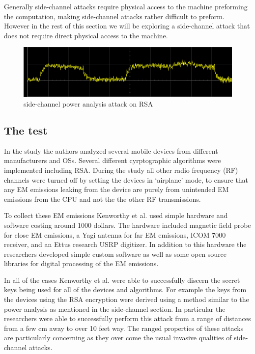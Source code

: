 \documentclass{sig-alternate}
\begin{document}
Generally side-channel attacks require physical access to the machine preforming the computation, making side-channel attacks rather difficult to preform. However in the rest of this section we will be exploring a side-channel attack that does not require direct physical access to the machine.    
 \begin{figure}
		\centering
		\includegraphics[scale=.5]{Power_attack.png}
		\caption{side-channel power analysis attack on RSA \cite{wiki:side-channel}}
		\label{Power}
		\end{figure}
\subsection{The test}
In the study the authors analyzed several mobile devices from different manufacturers and OSs. Several different cyrptographic algorithms were implemented including RSA. During the study all other radio frequency (RF) channels were turned off by setting the devices in `airplane' mode, to ensure that any EM emissions leaking from the device are purely from unintended EM emissions from the CPU and not the the other RF transmissions.

To collect these EM emissions Kenworthy et al. used simple hardware and software costing around 1000 dollars. The hardware included magnetic field probe for close EM emissions, a Yagi antenna for far EM emissions, ICOM 7000 receiver, and an Ettus research USRP digitizer. In addition to this hardware the researchers developed simple custom software as well as some open source libraries for digital processing of the EM emissions.

 In all of the cases Kenworthy et al. were able to successfully discern the secret keys being used for all of the devices and algorithms. For example the keys from the devices using the RSA encryption were derived using a method similar to the power analysis as mentioned in the side-channel section. In particular the researchers were able to successfully perform this attack from a range of distances from a few cm away to over 10 feet way. The ranged properties of these attacks are particularly concerning as they over come the usual invasive qualities of side-channel attacks.
 
\end{document}
